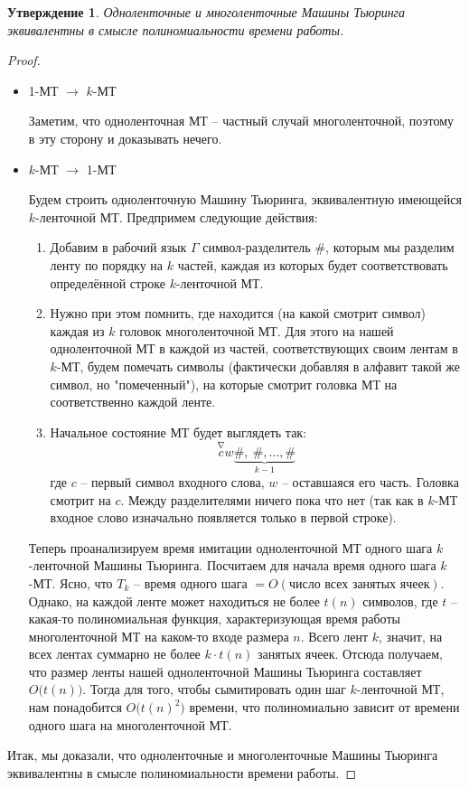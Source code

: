 \documentclass[a4paper,12pt]{article}
\newtheorem{statement}{Утверждение}
\begin{document}
\begin{statement}
Одноленточные и многоленточные Машины Тьюринга эквивалентны в смысле полиномиальности времени работы.
\end{statement}
\begin{proof}
\ 
\begin{itemize}
    \item 1-МТ $\to$ $k$-МТ
    
        Заметим, что одноленточная МТ -- частный случай многоленточной, поэтому в эту сторону и доказывать нечего.
    \item $k$-МТ $\to$ 1-МТ
    
        Будем строить одноленточную Машину Тьюринга, эквивалентную имеющейся $k$-ленточной МТ. Предпримем следующие действия:
        \begin{enumerate}
            \item Добавим в рабочий язык $\Gamma$ символ-разделитель $\#$, которым мы разделим ленту по порядку на $k$ частей, каждая из которых будет соответствовать определённой строке $k$-ленточной МТ.
            \item Нужно при этом помнить, где находится (на какой смотрит символ) каждая из $k$ головок многоленточной МТ. Для этого на нашей одноленточной МТ в каждой из частей, соответствующих своим лентам в $k$-МТ, будем помечать символы (фактически добавляя в алфавит такой же символ, но "помеченный"), на которые смотрит головка МТ на соответственно каждой ленте.
            \item Начальное состояние МТ будет выглядеть так:\[\overset{\nabla}{c}w\underbrace{\#,\ \#, \ldots, \#}_{k - 1}\] где $c$ -- первый символ входного слова, $w$ -- оставшаяся его часть. Головка смотрит на $c$. Между разделителями ничего пока что нет (так как в $k$-МТ входное слово изначально появляется только в первой строке).
        \end{enumerate}
        
        Теперь проанализируем время имитации одноленточной МТ одного шага $k$-ленточной Машины Тьюринга. Посчитаем для начала время одного шага $k$-МТ. Ясно, что $T_k$ -- время одного шага $= O(\text{число всех занятых ячеек})$. Однако, на каждой ленте может находиться не более $t(n)$ символов, где $t$ -- какая-то полиномиальная функция, характеризующая время работы многоленточной МТ на каком-то входе размера $n$. Всего лент $k$, значит, на всех лентах суммарно не более $k \cdot t(n)$ занятых ячеек. Отсюда получаем, что размер ленты нашей одноленточной Машины Тьюринга составляет $O\big(t(n)\big)$. Тогда для того, чтобы сымитировать один шаг $k$-ленточной МТ, нам понадобится $O\big(t(n)^2\big)$ времени, что полиномиально зависит от времени одного шага на многоленточной МТ.
\end{itemize}

Итак, мы доказали, что одноленточные и многоленточные Машины Тьюринга эквивалентны в смысле полиномиальности времени работы.
\end{proof}
\end{document}
